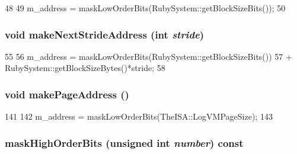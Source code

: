 \begin{DoxyCode}
48 {
49     m_address = maskLowOrderBits(RubySystem::getBlockSizeBits());
50 }
\end{DoxyCode}
\hypertarget{classAddress_a2cff729156aa38b416f0d32cea14977b}{
\subsubsection[{makeNextStrideAddress}]{\setlength{\rightskip}{0pt plus 5cm}void makeNextStrideAddress (int {\em stride})}}
\label{classAddress_a2cff729156aa38b416f0d32cea14977b}



\begin{DoxyCode}
55 {
56     m_address = maskLowOrderBits(RubySystem::getBlockSizeBits())
57         + RubySystem::getBlockSizeBytes()*stride;
58 }
\end{DoxyCode}
\hypertarget{classAddress_a9887a46e51d7ee63cc947dcdb0b29da3}{
\subsubsection[{makePageAddress}]{\setlength{\rightskip}{0pt plus 5cm}void makePageAddress ()}}
\label{classAddress_a9887a46e51d7ee63cc947dcdb0b29da3}



\begin{DoxyCode}
141 {
142     m_address = maskLowOrderBits(TheISA::LogVMPageSize);
143 }
\end{DoxyCode}
\hypertarget{classAddress_a81d4d297d2670a5d60ea08d23b2c7f96}{
\subsubsection[{maskHighOrderBits}]{ maskHighOrderBits (unsigned int {\em number}) const}}
\label{classAddress_a81d4d297d2670a5d60ea08d23b2c7f96}



